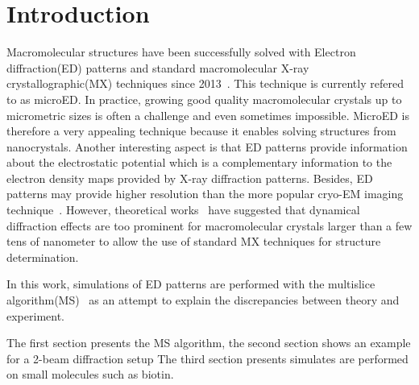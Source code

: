 % 
% 

\section{Introduction}
Macromolecular structures have been successfully solved with
Electron diffraction(ED) patterns and standard macromolecular X-ray crystallographic(MX) techniques since 2013~\cite{ShiNanenga2016,ClabbersGrueneAbrahams2017}.
This technique is currently refered to as microED.
In practice, growing good quality macromolecular crystals up to micrometric sizes is often a challenge and even sometimes impossible.
MicroED is therefore a very appealing technique because it enables solving structures from nanocrystals. Another interesting aspect is that ED patterns provide information about the electrostatic potential which is a complementary information to the electron density maps provided by X-ray diffraction patterns. Besides, ED patterns may provide higher resolution than the more popular cryo-EM imaging technique~\cite{Latychevskaia2019}.
However, theoretical works~\cite{GlaeserDowning1993,SubramanianSpence2015} have suggested that dynamical diffraction effects are too prominent for macromolecular crystals larger than a few tens of nanometer to allow the use of standard MX techniques for structure determination.

In this work, simulations of ED patterns are performed with the multislice algorithm(MS)~\cite{CowleyMoodie1957,Ishizuka2004,Kirkland2019} as an
attempt to explain the discrepancies between theory and experiment.

The first section presents the MS algorithm, the second section shows an example for a 2-beam diffraction setup
The third section presents simulates are performed on small molecules such as biotin.


% 
% 
% 
